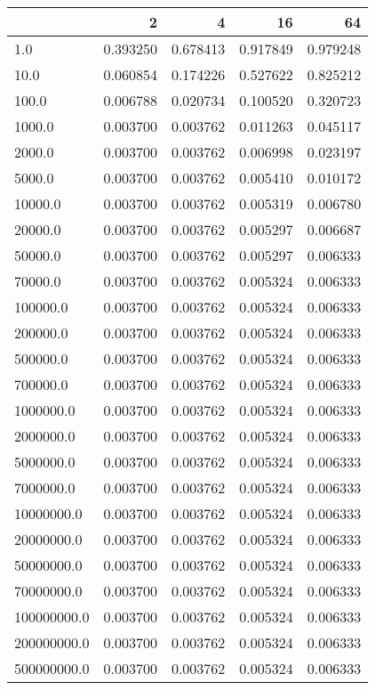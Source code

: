 \begin{tabular}{lrrrr}
\toprule
{} &        2  &        4  &        16 &        64 \\
\midrule
1.0         &  0.393250 &  0.678413 &  0.917849 &  0.979248 \\
10.0        &  0.060854 &  0.174226 &  0.527622 &  0.825212 \\
100.0       &  0.006788 &  0.020734 &  0.100520 &  0.320723 \\
1000.0      &  0.003700 &  0.003762 &  0.011263 &  0.045117 \\
2000.0      &  0.003700 &  0.003762 &  0.006998 &  0.023197 \\
5000.0      &  0.003700 &  0.003762 &  0.005410 &  0.010172 \\
10000.0     &  0.003700 &  0.003762 &  0.005319 &  0.006780 \\
20000.0     &  0.003700 &  0.003762 &  0.005297 &  0.006687 \\
50000.0     &  0.003700 &  0.003762 &  0.005297 &  0.006333 \\
70000.0     &  0.003700 &  0.003762 &  0.005324 &  0.006333 \\
100000.0    &  0.003700 &  0.003762 &  0.005324 &  0.006333 \\
200000.0    &  0.003700 &  0.003762 &  0.005324 &  0.006333 \\
500000.0    &  0.003700 &  0.003762 &  0.005324 &  0.006333 \\
700000.0    &  0.003700 &  0.003762 &  0.005324 &  0.006333 \\
1000000.0   &  0.003700 &  0.003762 &  0.005324 &  0.006333 \\
2000000.0   &  0.003700 &  0.003762 &  0.005324 &  0.006333 \\
5000000.0   &  0.003700 &  0.003762 &  0.005324 &  0.006333 \\
7000000.0   &  0.003700 &  0.003762 &  0.005324 &  0.006333 \\
10000000.0  &  0.003700 &  0.003762 &  0.005324 &  0.006333 \\
20000000.0  &  0.003700 &  0.003762 &  0.005324 &  0.006333 \\
50000000.0  &  0.003700 &  0.003762 &  0.005324 &  0.006333 \\
70000000.0  &  0.003700 &  0.003762 &  0.005324 &  0.006333 \\
100000000.0 &  0.003700 &  0.003762 &  0.005324 &  0.006333 \\
200000000.0 &  0.003700 &  0.003762 &  0.005324 &  0.006333 \\
500000000.0 &  0.003700 &  0.003762 &  0.005324 &  0.006333 \\
\bottomrule
\end{tabular}
